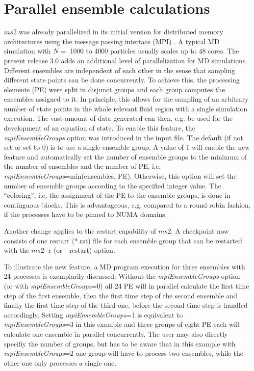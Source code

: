 \documentclass[preprint,12pt]{elsarticle}
\begin{document}
 


\section{Parallel ensemble calculations}
\label{sec:ParallelEnsembleCalculations}

$ms2$ was already parallelized in its initial version for distributed memory architectures using the message passing interface (MPI) \cite{ms2, ms2_2.0}. \textcolor[rgb]{0,0.58,0}{A typical MD simulation with $N=$ 1000 to 4000 particles usually scales up to 48 cores.}
The present release 3.0 adds an additional level of parallelization for MD simulations.
Different ensembles are independent of each other in the sense that sampling different state points can be done concurrently.
To achieve this, the processing elements (PE) were split in disjunct groups and each group computes the ensembles assigned to it. \textcolor[rgb]{0,0.58,0}{In principle, this allows for the sampling of an arbitrary number of state points in the whole relevant fluid region with a single simulation execution. The vast amount of data generated can then, e.g. be used for the development of an equation of state. }
To enable this feature, the \textit{mpiEnsembleGroups} option was introduced in the input file.
The default (if not set or set to 0) is to use a single ensemble group.
A value of 1 will enable the new feature and automatically set the number of ensemble groups to the minimum of the number of ensembles and the number of PE, 
i.e. \textit{mpiEnsembleGroups}=min(ensembles, PE). 
Otherwise, this option will set the number of ensemble groups according to the specified integer value.
The ``coloring'', i.e. the assignment of the PE to the ensemble groups, is done in continguous blocks.
This is advantageous, e.g. compared to a round robin fashion, %
if the processes have to be pinned to NUMA domains.

Another change applies to the restart capability of $ms2$. 
A checkpoint now consists of one restart (*.rst) file for each ensemble group that can be restarted with the $ms2$ -r (or -{}-restart) option.

To illustrate the new feature, a MD program execution for three ensembles with 24 processes is exemplarily discussed:
Without the \textit{mpiEnsembleGroups} option (or with \textit{mpiEnsembleGroups}=0) all 24 PE will in parallel calculate the first time step of the first ensemble, 
then the first time step of the second ensemble and finally the first time step of the third one, before the second time step is handled accordingly. 
Setting \textit{mpiEnsembleGroups}=1 is equivalent to \textit{mpiEnsembleGroups}=3 in this example and three groups of eight PE each will calculate
one ensemble in parallel concurrently. 
The user may also directly specifiy the number of groups, but has to be aware that in this example with \textit{mpiEnsembleGroups}=2 one group will have to 
process two ensembles, while the other one only processes a single one.
\end{document}

